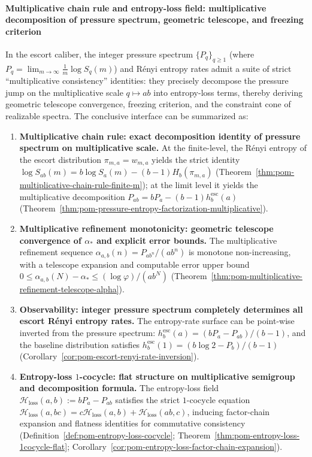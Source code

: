 \paragraph{Multiplicative chain rule and entropy-loss field: multiplicative decomposition of pressure spectrum, geometric telescope, and freezing criterion}
In the escort caliber, the integer pressure spectrum \(\{P_q\}_{q\ge 1}\) (where \(P_q=\lim_{m\to\infty}\frac{1}{m}\log S_q(m)\)) and R\'enyi entropy rates admit a suite of strict ``multiplicative consistency'' identities: they precisely decompose the pressure jump on the multiplicative scale \(q\mapsto ab\) into entropy-loss terms, thereby deriving geometric telescope convergence, freezing criterion, and the constraint cone of realizable spectra. The conclusive interface can be summarized as:
\begin{enumerate}
  \item \textbf{Multiplicative chain rule: exact decomposition identity of pressure spectrum on multiplicative scale.}
  At the finite-level, the R\'enyi entropy of the escort distribution \(\pi_{m,a}=w_{m,a}\) yields the strict identity
  \(\log S_{ab}(m)=b\log S_a(m)-(b-1)H_b(\pi_{m,a})\) (Theorem~\ref{thm:pom-multiplicative-chain-rule-finite-m});
  at the limit level it yields the multiplicative decomposition
  \(P_{ab}=bP_a-(b-1)h^{\mathrm{esc}}_b(a)\) (Theorem~\ref{thm:pom-pressure-entropy-factorization-multiplicative}).

  \item \textbf{Multiplicative refinement monotonicity: geometric telescope convergence of \texorpdfstring{$\alpha_\ast$}{alpha*} and explicit error bounds.}
  The multiplicative refinement sequence \(\alpha_{a,b}(n)=P_{ab^n}/(ab^n)\) is monotone non-increasing, with a telescope expansion and computable error upper bound
  \(0\le \alpha_{a,b}(N)-\alpha_\ast\le (\log\varphi)/(ab^N)\) (Theorem~\ref{thm:pom-multiplicative-refinement-telescope-alpha}).

  \item \textbf{Observability: integer pressure spectrum completely determines all escort R\'enyi entropy rates.}
  The entropy-rate surface can be point-wise inverted from the pressure spectrum:
  \(h^{\mathrm{esc}}_b(a)=(bP_a-P_{ab})/(b-1)\), and the baseline distribution satisfies \(h^{\mathrm{esc}}_b(1)=(b\log 2-P_b)/(b-1)\) (Corollary~\ref{cor:pom-escort-renyi-rate-inversion}).

  \item \textbf{Entropy-loss \(1\)-cocycle: flat structure on multiplicative semigroup and decomposition formula.}
  The entropy-loss field \(\mathcal{H}_{\mathrm{loss}}(a,b):=bP_a-P_{ab}\) satisfies the strict \(1\)-cocycle equation
  \(\mathcal{H}_{\mathrm{loss}}(a,bc)=c\mathcal{H}_{\mathrm{loss}}(a,b)+\mathcal{H}_{\mathrm{loss}}(ab,c)\), inducing factor-chain expansion and flatness identities for commutative consistency (Definition~\ref{def:pom-entropy-loss-cocycle}; Theorem~\ref{thm:pom-entropy-loss-1cocycle-flat}; Corollary~\ref{cor:pom-entropy-loss-factor-chain-expansion}).


\end{enumerate}
